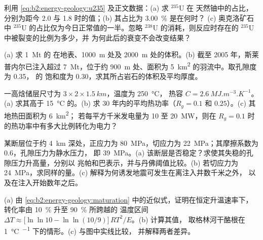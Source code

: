 \begin{exercise}[$\star\star$]\label{exo:b2:energy-geology:7}
利用 \eqref{eq:b2:energy-geology:u235} 及正文数据：(a) 求 $^{235}$U 在
天然铀中的占比，分别为距今 \qty{2.0}{\Ga} 与 \qty{1.8}{\Ga} 时的值；(b) 其占比为 \qty{3.00}{\percent} 是在何时？
(c) 奥克洛矿石中 $^{235}$U 的占比仅为今日正常值的一半。忽略 $^{238}$U
的消耗，则反应时存在的 $^{235}$U 中被裂变的比例为多少，并
为何此后的衰变不会改变结果？
\end{exercise}

\begin{exercise}[$\star\star$]\label{exo:b2:energy-geology:8}
(a) 求 \qty{1}{Mt} 的  在地表、\qty{1000}{m} 处及
\qty{2000}{m} 处的体积。(b) 截至 2005 年，斯莱普内尔已注入超过 \qty{7}{Mt}，位于约
\qty{900}{m} 处、面积为 \qty{5}{km^2} 的羽流中。取孔隙度为 0.35， 的
饱和度为 0.30，求其所占岩石的体积及平均厚度。
\end{exercise}

\begin{exercise}[$\star\star$]\label{exo:b2:energy-geology:9}
一高焓储层尺寸为 $3 \times 2 \times \qty{1.5}{km}$，温度为 \qty{250}{\celsius}，
热容 $C = \qty{2.6}{MJ.m^{-3}.K^{-1}}$。(a) 求其高于 \qty{15}{\celsius} 的。(b) 求
30 年内的平均热功率（$R_g = 0.1$ 和 $0.25$）。(c) 其地热田面积为 \qty{6}{km^2}；
若每平方千米发电量为 10 至 \qty{20}{MW}，则在
$R_g = 0.1$ 时的热功率中有多大比例转化为电力？
\end{exercise}

\begin{exercise}[$\star\star\star$]\label{exo:b2:energy-geology:10}
某断层位于约 \qty{4}{km} 深处，正应力为 \qty{80}{MPa}，切应力为
\qty{22}{MPa}；其摩擦系数为 0.6，孔隙压力为静水压力，
即 \qty{39}{MPa}。(a) 该断层是否稳定？求使其失稳的孔隙压力升高量，分别以
兆帕和巴表示，并与丹佛阈值比较。(b) 若切应力为
\qty{24}{MPa}，求同样的量。(c) 解释为何诱发地震可发生在离注入井数千米之外，
以及在注入开始数年之后。
\end{exercise}

\begin{exercise}[$\star\star\star$]\label{exo:b2:energy-geology:11}
(a) 由 \eqref{eq:b2:energy-geology:maturation} 中的近似式，证明在恒定升温速率下，
转化率由 \qty{10}{\percent} 升至 \qty{90}{\percent} 所跨越的
温度区间 $\Delta T \approx \bigl[\ln\ln 10 - \ln\ln(10/9)\bigr]\,RT^2/E$。(b) 计算其值，
取格林河干酪根在 \qty{1}{\celsius\per\Ma} 下的情形。(c) 与图中实线比较，
并解释两者差异。
\end{exercise}

